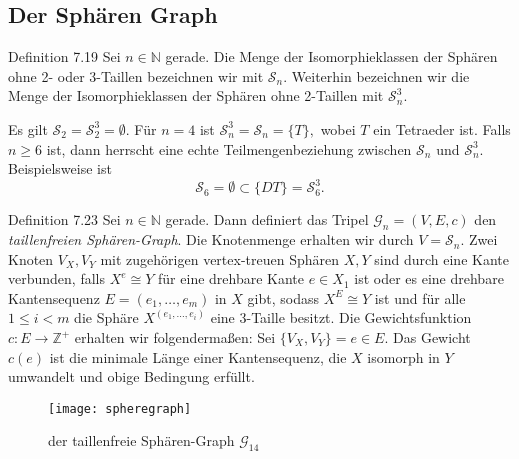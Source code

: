 \documentclass{beamer}
\begin{document}
\subsection{Der Sphären Graph}
\begin{frame}
\begin{block}{Definition 7.19}
Sei $n\in \mathbb{N}$ gerade. Die Menge der Isomorphieklassen der Sphären ohne 2- oder 3-Taillen bezeichnen wir mit $\mathcal{S}_n.$ Weiterhin bezeichnen wir die Menge der Isomorphieklassen der Sphären ohne 2-Taillen mit $\mathcal{S}_n^3.$
\end{block}
\end{frame}
\begin{frame}
Es gilt $\mathcal{S}_2=\mathcal{S}_2^3=\emptyset.$ 
 Für $n=4$ ist $\mathcal{S}_n^3=\mathcal{S}_n=\{T\},$ wobei $T$ ein Tetraeder ist.
 Falls $n\geq 6$ ist, dann herrscht eine echte Teilmengenbeziehung zwischen $\mathcal{S}_n$ und $\mathcal{S}_n^3.$ Beispielsweise ist 
 \[
 \mathcal{S}_6=\emptyset \subset \{DT\}=\mathcal{S}_6^3.
 \]
\end{frame}
\begin{frame}
\begin{block}{Definition 7.23}
Sei $n\in \mathbb{N}$ gerade. Dann definiert das Tripel $\mathcal{G}_n=(V,E,c)$ den \emph{taillenfreien Sphären-Graph}. Die Knotenmenge erhalten wir durch $V=\mathcal{S}_n.$ Zwei Knoten $V_X,V_Y$ mit zugehörigen vertex-treuen Sphären $X,Y$ sind durch eine Kante verbunden, falls $X^e\cong Y$ für eine drehbare Kante $e\in X_1$ ist oder es eine drehbare Kantensequenz $E=(e_1,\ldots,e_m)$ in $X$ gibt, sodass $X^E\cong Y$ ist und für alle $1\leq i < m $ die Sphäre $X^{(e_1,\ldots,e_i)}$ eine 3-Taille besitzt. Die Gewichtsfunktion $c:E\to\mathbb{Z}^+$  erhalten wir folgendermaßen: Sei $\{V_X,V_Y\}=e\in E.$ Das Gewicht $c(e)$ ist die minimale Länge einer Kantensequenz, die $X$ isomorph in $Y$ umwandelt und obige Bedingung erfüllt.
\end{block}
\end{frame}
 \begin{figure}[H]
\begin{center}
\texttt{[image: spheregraph]}
\end{center}
\caption{der taillenfreie Sphären-Graph $\mathcal{G}_{14}$}
\end{figure}
\end{document}
